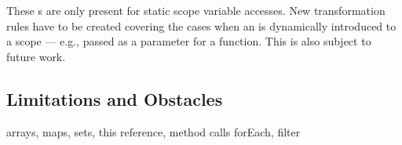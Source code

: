 These s are only present for static scope variable accesses. New transformation rules have to be created covering the cases when an  is dynamically introduced to a scope --- e.g., passed as a parameter for a function. This is also subject to future work.

\subsection{Limitations and Obstacles}
arrays, maps, sets, this reference, method calls forEach, filter

